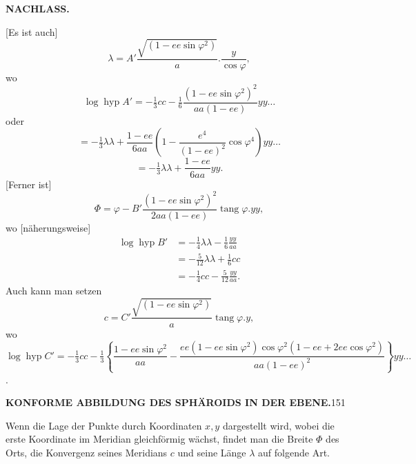 \par\clearpage
{}\hfill{\small\textbf{NACHLASS.}}\hfill\null\par\medskip
{\centering [4.]\par}
[Es ist auch]
\[\lambda=A'\frac{\sqrt{(1-ee\sin\varphi^2)}}a.\frac y{\cos\varphi},\]
\noindent wo
\[\log\operatorname{hyp}A'=-\tfrac13cc-\tfrac16\frac{(1-ee\sin\varphi^2)^2}{aa(1-ee)}yy\ldots\]
\noindent oder
\[=-\tfrac13\lambda\lambda+\frac{1-ee}{6aa}\left(1-\frac{e^4}{(1-ee)^2}\cos\varphi^4\right)yy\ldots\]
\[=-\tfrac13\lambda\lambda+\frac{1-ee}{6aa}yy.\]
[Ferner ist]
\[\Phi=\varphi-B'\frac{(1-ee\sin\varphi^2)^2}{2aa(1-ee)}\operatorname{tang}\varphi.yy,\]
\noindent wo [näherungsweise]
\[
\begin{aligned}
\log\operatorname{hyp}B'&=-\tfrac14\lambda\lambda-\tfrac16\frac{yy}{aa}\\
&=-\tfrac5{12}\lambda\lambda+\tfrac16cc\\
&=-\tfrac14cc-\tfrac5{12}\frac{yy}{aa}.
\end{aligned}
\]
Auch kann man setzen
\[c=C'\frac{\sqrt{(1-ee\sin\varphi^2)}}a\operatorname{tang}\varphi.y,\]
\noindent wo
\[
\log\operatorname{hyp}C'=-\tfrac13cc-\tfrac13\left\{\frac{1-ee\sin\varphi^2}{aa}-\frac{ee(1-ee\sin\varphi^2)\cos\varphi^2(1-ee+2ee\cos\varphi^2)}{aa(1-ee)^2}\right\}yy\ldots
\]
.\]

\par\clearpage
\noindent\null\hfill{\small\textbf{KONFORME ABBILDUNG DES SPHÄROIDS IN DER EBENE.}}\hfill151\par\medskip
{\centering [5.]\par}
Wenn die Lage der Punkte durch Koordinaten \(x,y\) dargestellt wird, wobei die erste Koordinate im Meridian gleichförmig wächst, findet man die Breite \(\Phi\) des Orts, die Konvergenz seines Meridians \(c\) und seine Länge \(\lambda\) auf folgende Art.

